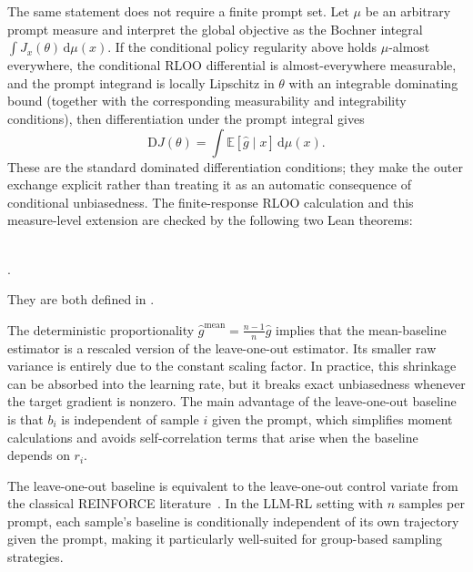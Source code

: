 The same statement does not require a finite prompt set. Let $\mu$ be an
arbitrary prompt measure and interpret the global objective as the Bochner
integral $\int J_x(\theta)\,\mathrm d\mu(x)$. If the conditional policy
regularity above holds $\mu$-almost everywhere, the conditional RLOO
differential is almost-everywhere measurable, and the prompt integrand is
locally Lipschitz in $\theta$ with an integrable dominating bound (together
with the corresponding measurability and integrability conditions), then
differentiation under the prompt integral gives
\[
 \mathrm D J(\theta)
 = \int \mathbb E[\hat g\mid x] \,\mathrm d\mu(x).
\]
These are the standard dominated differentiation conditions; they make the
outer exchange explicit rather than treating it as an automatic consequence
of conditional unbiasedness. The finite-response RLOO calculation and this
measure-level extension are checked by the following two Lean theorems:
\begin{center}
\\
.
\end{center}
They are both defined in .

\begin{remark}
The deterministic proportionality $\hat{g}^{\mathrm{mean}} = \frac{n-1}{n}\hat{g}$ implies that the mean-baseline estimator is a
rescaled version of the leave-one-out estimator. Its smaller raw variance is entirely due to the constant scaling factor. In practice,
this shrinkage can be absorbed into the learning rate, but it breaks exact unbiasedness whenever the target gradient is nonzero. The main advantage of the
leave-one-out baseline is that $b_i$ is independent of sample $i$ given the prompt, which simplifies moment calculations and avoids self-correlation terms
that arise when the baseline depends on $r_i$.
\end{remark}

\begin{remark}
The leave-one-out baseline is equivalent to the leave-one-out control variate from the classical REINFORCE literature~\citep{williams1992simple}. In the LLM-RL setting with $n$ samples per prompt, each sample's baseline is conditionally independent of its own trajectory given the prompt, making it particularly well-suited for group-based sampling strategies.
\end{remark}

